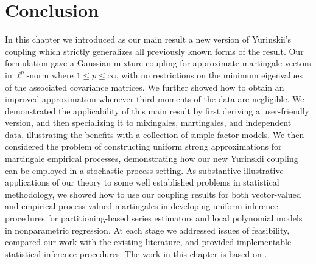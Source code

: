 \section{Conclusion}
\label{sec:yurinskii_conclusion}

In this chapter we introduced as our main result a new version of Yurinskii's
coupling which strictly generalizes all previously known forms of the result.
Our formulation gave a Gaussian mixture coupling for approximate martingale
vectors in $\ell^p$-norm where $1 \leq p \leq \infty$, with no restrictions on
the minimum eigenvalues of the associated covariance matrices. We further
showed how to obtain an improved approximation whenever third moments of the
data are negligible. We demonstrated the applicability of this main result by
first deriving a user-friendly version, and then specializing it to mixingales,
martingales, and independent data, illustrating the benefits with a collection
of simple factor models. We then considered the problem of constructing uniform
strong approximations for martingale empirical processes, demonstrating how our
new Yurinskii coupling can be employed in a stochastic process setting. As
substantive illustrative applications of our theory to some
well established problems in statistical methodology, we showed how to use our
coupling results for both vector-valued and empirical process-valued
martingales in developing uniform inference procedures for partitioning-based
series estimators and local polynomial models in nonparametric regression. At
each stage we addressed issues of feasibility, compared our work with the
existing literature, and provided implementable statistical inference
procedures. The work in this chapter is based on \citet{cattaneo2022yurinskii}.
